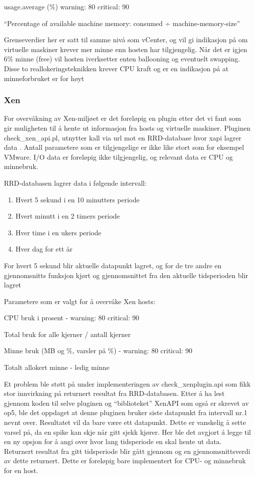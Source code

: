  usage.average (\%) warning: 80 critical: 90

“Percentage of available machine memory: consumed ÷ machine-memory-size”

Grenseverdier her er satt til samme nivå som vCenter, og vil gi indikasjon på om virtuelle maskiner krever mer minne enn hosten har tilgjengelig. Når det er igjen 6\% minne (free) vil hosten iverksetter enten ballooning og eventuelt swapping. Disse to reallokeringsteknikken krever CPU kraft og er en indikasjon på at minneforbruket er for høyt

\subsubsection{Xen}

For overvåkning av Xen-miljøet er det foreløpig en plugin etter det vi fant som gir muligheten til å hente ut informasjon fra hosts og virtuelle maskiner. Pluginen check\_xen\_api.pl, utnytter kall via url mot en RRD-database hvor xapi lagrer data \cite{xenwiki}. 
Antall parametere som er tilgjengelige er ikke like stort som for eksempel VMware. I/O data er foreløpig ikke tilgjengelig, og relevant data er CPU og minnebruk.

RRD-databasen lagrer data i følgende intervall:
\begin{enumerate}
	\item Hvert 5 sekund i en 10 minutters periode
	\item Hvert minutt i en 2 timers periode
	\item Hver time i en ukers periode
	\item Hver dag for ett år
\end{enumerate}

For hvert 5 sekund blir aktuelle datapunkt lagret, og for de tre andre en gjennomsnitts funksjon kjørt og gjennomsnittet fra den aktuelle tidsperioden blir lagret 

Parametere som er valgt for å overvåke Xen hosts:

CPU bruk i prosent - warning: 80 critical: 90 

Total bruk for alle kjerner / antall kjerner

Minne bruk (MB og \%, varsler på \%) - warning: 80 critical: 90

Totalt allokert minne - ledig minne 

Et problem ble støtt på under implementeringen av check\_xenplugin.api som fikk stor innvirkning på returnert resultat fra RRD-databasen. Etter å ha lest gjennom koden til selve pluginen og “biblioteket” XenAPI som også er skrevet av op5, ble det oppdaget at denne pluginen bruker siste datapunkt fra intervall nr.1 nevnt over. Resultatet vil da bare være ett datapunkt. Dette er vanskelig å sette varsel på, da en spike kan skje når gitt sjekk kjører. Her ble det avgjort å legge til en ny opsjon for å angi over hvor lang tidsperiode en skal hente ut data. Returnert resultat fra gitt tidsperiode blir gått gjennom og en gjennomsnittsverdi av dette returnert. Dette er foreløpig bare implementert for CPU- og minnebruk for en host.

